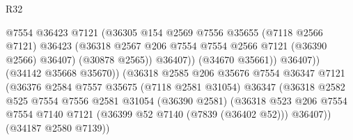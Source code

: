 \begin{lexlean}{R32}
\begin{coremodule}
                                          @7554
                                          @36423
                                          @7121
                                          (@36305
                                            @154
                                            @2569
                                            @7556
                                            @35655
                                            (@7118 @2566 @7121)
                                            @36423
                                            (@36318
                                              @2567
                                              @206
                                              @7554
                                              @7554
                                              @2566
                                              @7121
                                              (@36390 @2566)
                                              @36407)
                                            (@30878 @2565))
                                          @36407))
                                      (@34670 @35661))
                                    @36407))
                                (@34142 @35668 @35670))
                              (@36318
                                @2585
                                @206
                                @35676
                                @7554
                                @36347
                                @7121
                                (@36376
                                  @2584
                                  @7557
                                  @35675
                                  (@7118 @2581 @31054)
                                  @36347
                                  (@36318
                                    @2582
                                    @525
                                    @7554
                                    @7556
                                    @2581
                                    @31054
                                    (@36390 @2581)
                                    (@36318
                                      @523
                                      @206
                                      @7554
                                      @7554
                                      @7140
                                      @7121
                                      (@36399 @52 @7140 (@7839 (@36402 @52)))
                                      @36407))
                                  (@34187 @2580 @7139))

\end{coremodule}
\end{lexlean}
